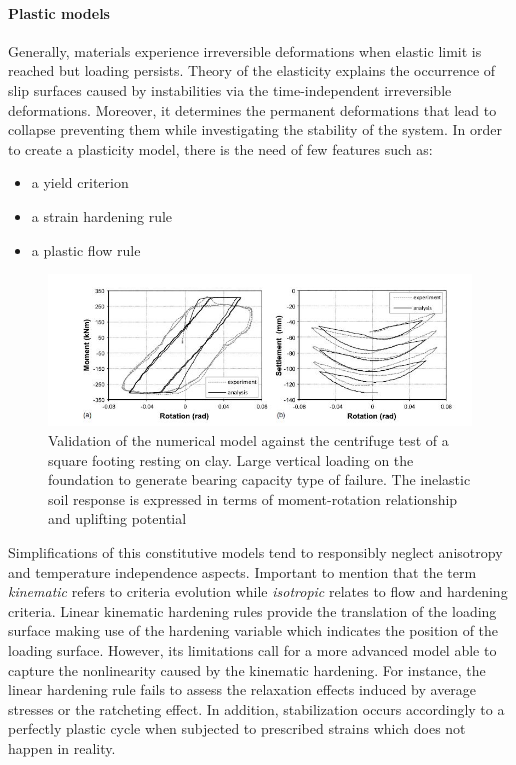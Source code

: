 \documentclass[11pt,a4paper]{report}
\begin{document}
\paragraph{Plastic models} Generally, materials experience irreversible deformations when elastic limit is reached but loading persists. Theory of the elasticity explains the occurrence of slip surfaces caused by instabilities via the time-independent irreversible deformations. Moreover, it determines the permanent deformations that lead to collapse preventing them while investigating the stability of the system. 
In order to create a plasticity model, there is the need of few features such as:
\begin{itemize}
	\item a yield criterion\
	\item a strain hardening rule\
	\item a plastic flow rule\
\end{itemize}

\begin{figure}[!h]
	\centering
	\includegraphics[width=0.6 \linewidth]{"exper"}
	\caption{Validation of the numerical model against the centrifuge test of a square footing resting on clay. Large vertical loading on the foundation to generate bearing capacity type of failure. The inelastic soil response is expressed in terms of moment-rotation relationship and uplifting potential}
	\label{experimental}
\end{figure}

Simplifications of this constitutive models tend to responsibly neglect anisotropy and \mbox{temperature} independence aspects. Important to mention that the term \textit{kinematic} refers to criteria evolution while \textit{isotropic} relates to flow and hardening criteria. Linear kinematic hardening rules provide the translation of the loading surface making use of the hardening variable which indicates the position of the loading surface. However, its limitations call for a more advanced model able to capture the nonlinearity caused by the kinematic hardening. For instance, the linear hardening rule fails to assess the relaxation effects induced by average stresses or the ratcheting effect. In addition, stabilization occurs accordingly to a perfectly plastic cycle when subjected to prescribed strains which does not happen in reality.
\end{document}
